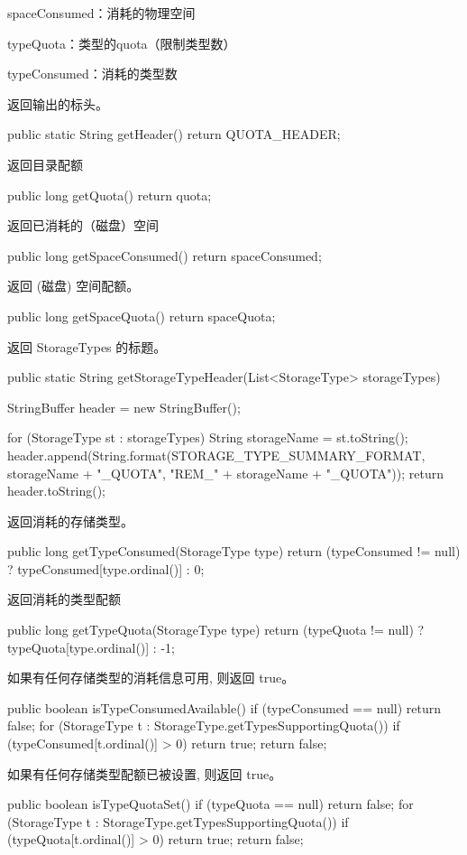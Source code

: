 spaceConsumed：消耗的物理空间

typeQuota：类型的quota（限制类型数）

typeConsumed：消耗的类型数

返回输出的标头。
\begin{java}
public static String getHeader() {
  return QUOTA_HEADER;
}
\end{java}
返回目录配额
\begin{java}
public long getQuota() {
  return quota;
}
\end{java}
返回已消耗的（磁盘）空间
\begin{java}
public long getSpaceConsumed() {
  return spaceConsumed;
}
\end{java}
返回 (磁盘) 空间配额。
\begin{java}
public long getSpaceQuota() {
  return spaceQuota;
}
\end{java}
返回 StorageTypes 的标题。
\begin{java}
public static String getStorageTypeHeader(List<StorageType> storageTypes) {
  StringBuffer header = new StringBuffer();

  for (StorageType st : storageTypes) {
    String storageName = st.toString();
    header.append(String.format(STORAGE_TYPE_SUMMARY_FORMAT,
        storageName + "_QUOTA", "REM_" + storageName + "_QUOTA"));
  }
  return header.toString();
}
\end{java}
返回消耗的存储类型。
\begin{java}
public long getTypeConsumed(StorageType type) {
  return (typeConsumed != null) ? typeConsumed[type.ordinal()] : 0;
}
\end{java}
返回消耗的类型配额
\begin{java}
public long getTypeQuota(StorageType type) {
  return (typeQuota != null) ? typeQuota[type.ordinal()] : -1;
}
\end{java}
如果有任何存储类型的消耗信息可用, 则返回 true。
\begin{java}
public boolean isTypeConsumedAvailable() {
  if (typeConsumed == null) {
    return false;
  }
  for (StorageType t : StorageType.getTypesSupportingQuota()) {
    if (typeConsumed[t.ordinal()] > 0) {
      return true;
    }
  }
  return false;
}
\end{java}
如果有任何存储类型配额已被设置, 则返回 true。
\begin{java}
public boolean isTypeQuotaSet() {
  if (typeQuota == null) {
    return false;
  }
  for (StorageType t : StorageType.getTypesSupportingQuota()) {
    if (typeQuota[t.ordinal()] > 0) {
      return true;
    }
  }
  return false;
}
\end{java}


